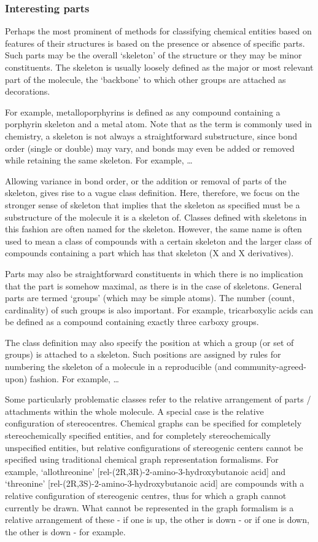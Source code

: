 \documentclass[10pt]{bmc_article}
\newenvironment{bmcformat}{\baselineskip20pt\sloppy\setboolean{publ}{false}}{\baselineskip20pt\sloppy}
\begin{document}
\begin{bmcformat}
\subsubsection*{Interesting parts}

Perhaps the most prominent of methods for classifying chemical entities based on features of their structures is based on the presence or absence of specific parts.  Such parts may be the overall `skeleton' of the structure or they may be minor constituents. The skeleton is usually loosely defined as the major or most relevant part of the molecule, the `backbone' to which other groups are attached as decorations. 

For example, metalloporphyrins is defined as any compound containing a porphyrin skeleton and a metal atom.  Note that as the term is commonly used in chemistry, a skeleton is not always a straightforward substructure, since bond order (single or double) may vary, and bonds may even be added or removed while retaining the same skeleton. For example, \ldots
 
Allowing variance in bond order, or the addition or removal of parts of the skeleton, gives rise to a vague class definition. Here, therefore, we focus on the stronger sense of skeleton that implies that the skeleton as specified must be a substructure of the molecule it is a skeleton of. Classes defined with skeletons in this fashion are often named for the skeleton.  However, the same name is often used to mean a class of compounds with a certain skeleton and the larger class of compounds containing a part which has that skeleton (X and X derivatives). 

Parts may also be straightforward constituents in which there is no implication that the part is somehow maximal, as there is in the case of skeletons.  General parts are termed `groups' (which may be simple atoms). The number (count, cardinality) of such groups is also important.  For example, tricarboxylic acids can be defined as a compound containing exactly three carboxy groups. 

The class definition may also specify the position at which a group (or set of groups) is attached to a skeleton. Such positions are assigned by rules for numbering the skeleton of a molecule in a reproducible (and community-agreed-upon) fashion.  For example, \ldots

Some particularly problematic classes refer to the relative arrangement of parts / attachments within the whole molecule. A special case is the relative configuration of stereocentres. Chemical graphs can be specified for completely stereochemically specified entities, and for completely stereochemically unspecified entities, but relative configurations of stereogenic centers cannot be specified using traditional chemical graph representation formalisms. For example, `allothreonine' [rel-(2R,3R)-2-amino-3-hydroxybutanoic acid] and `threonine' [rel-(2R,3S)-2-amino-3-hydroxybutanoic acid] are compounds with a relative configuration of stereogenic centres, thus for which a graph cannot currently be drawn. What cannot be represented in the graph formalism is a relative arrangement of these - if one is up, the other is down - or if one is down, the other is down - for example. 



\end{bmcformat}
\end{document}
